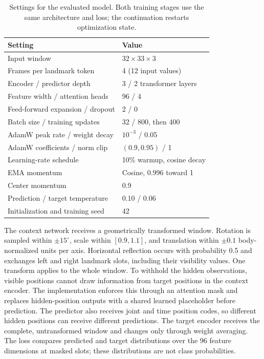 \documentclass[10pt,twocolumn,letterpaper]{article}
\begin{document}
\begin{table}[t]
\centering
\caption{Settings for the evaluated model. Both training stages use the same architecture and loss; the continuation restarts optimization state.}
\label{tab:settings}
\small
\setlength{\tabcolsep}{4pt}
\begin{tabular}{p{}p{}}
\toprule
Setting & Value\\
\midrule
Input window & $32\times33\times3$\\
Frames per landmark token & 4 (12 input values)\\
Encoder / predictor depth & 3 / 2 transformer layers\\
Feature width / attention heads & 96 / 4\\
Feed-forward expansion / dropout & 2 / 0\\
Batch size / training updates & 32 / 800, then 400\\
AdamW peak rate / weight decay & $10^{-3}$ / 0.05\\
AdamW coefficients / norm clip & $(0.9,0.95)$ / 1\\
Learning-rate schedule & 10\% warmup, cosine decay\\
EMA momentum & Cosine, 0.996 toward 1\\
Center momentum & 0.9\\
Prediction / target temperature & 0.10 / 0.06\\
Initialization and training seed & 42\\
\bottomrule
\end{tabular}
\end{table}

The context network receives a geometrically transformed window. Rotation is sampled within $\pm15^\circ$, scale within $[0.9,1.1]$, and translation within $\pm0.1$ body-normalized units per axis. Horizontal reflection occurs with probability 0.5 and exchanges left and right landmark slots, including their visibility values. One transform applies to the whole window. To withhold the hidden observations, visible positions cannot draw information from target positions in the context encoder. The implementation enforces this through an attention mask and replaces hidden-position outputs with a shared learned placeholder before prediction. The predictor also receives joint and time position codes, so different hidden positions can receive different predictions. The target encoder receives the complete, untransformed window and changes only through weight averaging. The loss compares predicted and target distributions over the 96 feature dimensions at masked slots; these distributions are not class probabilities.
\end{document}

